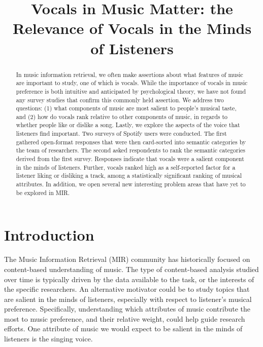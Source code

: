\documentclass{article}
\title{Vocals in Music Matter: the Relevance of Vocals in the Minds of Listeners}
\newcommand {\ak}[1]{{\color{teal}{{#1}}}}
\begin{document}
\maketitle

\begin{abstract}
In music information retrieval, we often make assertions about what features of music are important to study, one of which is vocals.
While the importance of vocals in music preference is both intuitive and anticipated by psychological theory, we have not found any survey studies that confirm this commonly held assertion.
We address two questions: (1) what components of music are most salient to people's musical taste, and (2) how do vocals rank relative to other components of music, in regards to whether people like or dislike a song. Lastly, we explore the aspects of the voice that listeners find important.  Two surveys of Spotify users were conducted. The first gathered open-format responses that were then card-sorted into semantic categories by the team of researchers.  The second asked respondents to rank the semantic categories derived from the first survey. Responses indicate that vocals were a salient component in the minds of listeners. Further, vocals ranked high as a self-reported factor for a listener liking or disliking a track, among a statistically significant ranking of musical attributes.
In addition, we open several new interesting problem areas that have yet to be explored in MIR.
\end{abstract}

\section{Introduction}



The Music Information Retrieval (MIR) community has historically focused on content-based understanding of music. The type of content-based analysis studied over time is typically driven by the data available to the task, or the interests of the specific researchers. An alternative motivator could be to study topics that are salient in the minds of listeners, especially with respect to listener's musical preference. Specifically, understanding which attributes of music contribute the most to music preference, and their relative weight, could help guide research efforts. One attribute of music we would expect to be salient in the minds of listeners is the singing voice.
\end{document}
